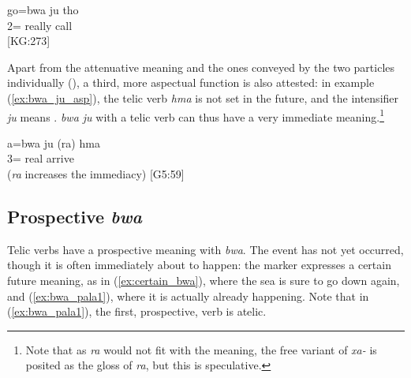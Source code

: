\ea%
\gll  go=bwa ju tho\\
 2= really call\\
\glt {} {[KG:273]}
\z

Apart from the attenuative meaning and the ones conveyed by the two particles individually (),
a third, more aspectual function is also attested: in example (\ref{ex:bwa_ju_asp}), the telic verb \textit{hma}  is not set in the future, and the intensifier \textit{ju} means . \textit{bwa ju} with a telic verb can thus have a very immediate meaning.\footnote{Note that as \textit{ra}  would not fit with the meaning, the free variant of \textit{xa-}  is posited as the gloss of \textit{ra}, but this is speculative.}%

%
%
%
%
%
%
%
%
%
%
%

\ea \label{ex:bwa_ju_asp} 
\gll a=bwa ju (ra) hma\\
 3= real  arrive\\
\glt {} (\textit{ra} increases the immediacy) {[G5:59]}
\z


\subsection{Prospective \textit{bwa}}
Telic verbs have a prospective meaning with \textit{bwa}. The event has not yet occurred, though it is often immediately about to happen: the marker expresses a certain future meaning, as in (\ref{ex:certain_bwa}), where the sea is sure to go down again, and (\ref{ex:bwa_pala1}), where it is actually already happening. Note that in (\ref{ex:bwa_pala1}), the first, prospective, verb is atelic.


